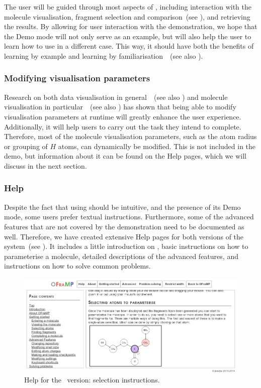 The user will be guided through most aspects of \oframp, including interaction with the molecule visualisation, fragment selection and comparison~(see ), and retrieving the results. By allowing for user interaction with the demonstration, we hope that the Demo mode will not only serve as an example, but will also help the user to learn how to use \oframp{} in a different case. This way, it should have both the benefits of learning by example and learning by familiarisation~\cite{sweller1994cognitive}~(see also ).

\subsubsection{Modifying visualisation parameters}
Research on both data visualisation in general~\cite{gallopoulos1994computer}~(see also ) and molecule visualisation in particular~\cite{aksela2008computer,taylor2013interface}~(see also ) has shown that being able to modify visualisation parameters at runtime will greatly enhance the user experience. Additionally, it will help users to carry out the task they intend to complete. Therefore, most of the molecule visualisation parameters, such as the atom radius or grouping of $H$ atoms, can dynamically be modified. This is not included in the demo, but information about it can be found on the \oframp{} Help pages, which we will discuss in the next section.

\subsubsection{Help}
Despite the fact that using \oframp{} should be intuitive, and the presence of its Demo mode, some users prefer textual instructions. Furthermore, some of the advanced features that are not covered by the demonstration need to be documented as well. Therefore, we have created extensive Help pages for both versions of the system~(see ). It includes a little introduction on \oframp, basic instructions on how to parameterise a molecule, detailed descriptions of the advanced features, and instructions on how to solve common problems.

\begin{figure}
\center
\includegraphics[width=.9\textwidth]{img/help.png}
\caption{\oframp{} Help for the \IDa\ version: selection instructions.}
\end{figure}

